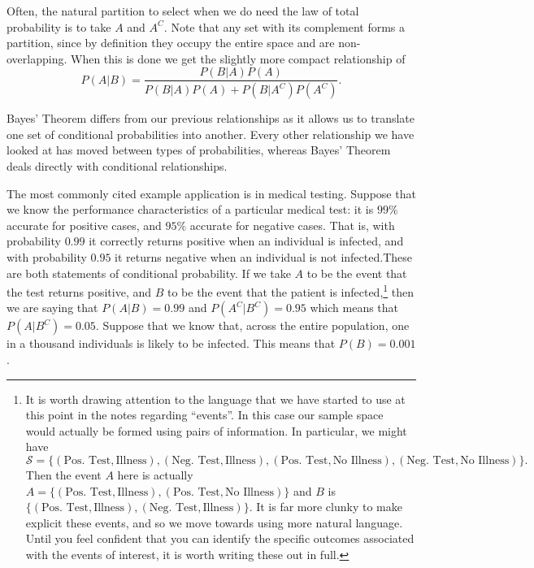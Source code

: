 \documentclass[
  letterpaper,
  DIV=11,
  numbers=noendperiod]{scrreprt}
\theoremstyle{definition}
\theoremstyle{definition}
\theoremstyle{definition}
\theoremstyle{remark}
\begin{document}
Often, the natural partition to select when we do need the law of total
probability is to take \(A\) and \(A^C\). Note that any set with its
complement forms a partition, since by definition they occupy the entire
space and are non-overlapping. When this is done we get the slightly
more compact relationship of
\[P(A|B) = \frac{P(B|A)P(A)}{P(B|A)P(A) + P(B|A^C)P(A^C)}.\]

Bayes' Theorem differs from our previous relationships as it allows us
to translate one set of conditional probabilities into another. Every
other relationship we have looked at has moved between types of
probabilities, whereas Bayes' Theorem deals directly with conditional
relationships.

The most commonly cited example application is in medical testing.
Suppose that we know the performance characteristics of a particular
medical test: it is \(99\%\) accurate for positive cases, and \(95\%\)
accurate for negative cases. That is, with probability \(0.99\) it
correctly returns positive when an individual is infected, and with
probability \(0.95\) it returns negative when an individual is not
infected.These are both statements of conditional probability. If we
take \(A\) to be the event that the test returns positive, and \(B\) to
be the event that the patient is infected,\footnote{It is worth drawing
  attention to the language that we have started to use at this point in
  the notes regarding ``events''. In this case our sample space would
  actually be formed using pairs of information. In particular, we might
  have
  \[\mathcal{S} = \{(\text{Pos. Test}, \text{Illness}), (\text{Neg. Test}, \text{Illness}),(\text{Pos. Test}, \text{No Illness}),(\text{Neg. Test}, \text{No Illness})\}.\]
  Then the event \(A\) here is actually
  \(A = \{(\text{Pos. Test}, \text{Illness}),(\text{Pos. Test}, \text{No Illness})\}\)
  and \(B\) is
  \(\{(\text{Pos. Test}, \text{Illness}),(\text{Neg. Test}, \text{Illness})\}\).
  It is far more clunky to make explicit these events, and so we move
  towards using more natural language. Until you feel confident that you
  can identify the specific outcomes associated with the events of
  interest, it is worth writing these out in full.} then we are saying
that \(P(A|B) = 0.99\) and \(P(A^C|B^C) = 0.95\) which means that
\(P(A|B^C) = 0.05\). Suppose that we know that, across the entire
population, one in a thousand individuals is likely to be infected. This
means that \(P(B) = 0.001\).
\end{document}
